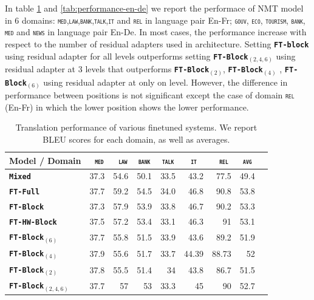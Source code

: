\documentclass[11pt,a4paper]{article}
\newcommand{\fyDone}[1]{\done[FY]\Todo[FY:]{\textcolor{orange}{#1}}}
\newcommand{\domain}[1]{\texttt{\textsc{#1}}}
\newcommand{\system}[1]{\texttt{\textbf{#1}}}
\begin{document}
In table \ref{tab:performance-en-fr} and \ref{tab:performance-en-de} we report the performace of NMT model in 6 domains: \domain{med},\domain{law},\domain{bank},\domain{talk},\domain{it} and \domain{rel} in language pair En-Fr; \domain{gouv}, \domain{eco}, \domain{tourism}, \domain{bank}, \domain{med} and \domain{news} in language pair En-De. In most cases, the performance increase with respect to the number of residual adapters used in architecture. Setting \system{FT-block} using residual adapter for all levels outperforms setting \system{FT-Block$_{(2,4,6)}$} using residual adapter at 3 levels that outperforms \system{FT-Block$_{(2)}$}, \system{FT-Block$_{(4)}$} , \system{FT-Block$_{(6)}$} using residual adapter at only on level. However, the difference in performance between positions is not significant except the case of domain \domain{rel} (En-Fr) in which the lower position shows the lower performance.   
\begin{table}[htbp]
  \centering
  \fyDone{Fix column size}
  \begin{tabular}{|p{3cm}|*{8}{r|}} \hline
    Model / Domain & \multicolumn{1}{c|}{\domain{ med}} & \multicolumn{1}{c|}{\domain{ law}} & \multicolumn{1}{c|}{\domain{bank}} & \multicolumn{1}{c|}{\domain{talk}} & \multicolumn{1}{c|}{\domain{ it }} & \multicolumn{1}{c|}{\domain{ rel}} & \multicolumn{1}{c|}{\domain{avg}} \\ \hline %
    \system{Mixed}  & 37.3 & 54.6 & 50.1 & 33.5 & 43.2 & 77.5  & 49.4 \\
    \system{FT-Full}       & 37.7 & 59.2 & 54.5 & 34.0 & 46.8 & 90.8 & 53.8 \\
   \system{FT-Block}     & 37.3 & 57.9 & 53.9 & 33.8 & 46.7 & 90.2 & 53.3 \\ 
   \system{FT-HW-Block}   & 37.5 & 57.2 & 53.4 & 33.1 & 46.3 & 91 & 53.1 \\ 
   \system{FT-Block$_{(6)}$}     & 37.7 & 55.8 & 51.5 & 33.9 & 43.6 & 89.2 & 51.9 \\
   \system{FT-Block$_{(4)}$}     & 37.9 & 55.6 & 51.7 & 33.7 & 44.39 & 88.73 & 52 \\
   \system{FT-Block$_{(2)}$}     & 37.8 & 55.5 & 51.4 & 34 & 43.8 & 86.7 & 51.5 \\
   \system{FT-Block$_{(2,4,6)}$}     & 37.7 & 57 & 53 & 33.3 & 45 & 90 & 52.7 \\
     \hline
  \end{tabular}
  \caption{Translation performance of various finetuned systems. We report BLEU scores for each domain, as well as averages.}
  \label{tab:performance-en-fr}
\end{table}
\end{document}
